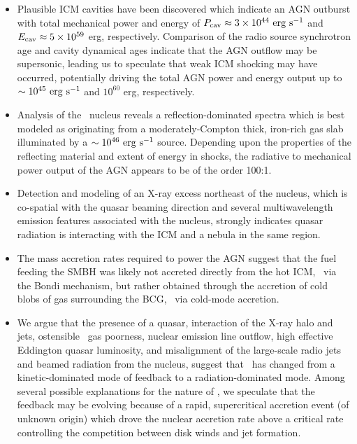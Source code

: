 \documentclass[useAMS,usenatbib]{mn2e}
\begin{document}
\begin{itemize}
\item Plausible ICM cavities have been discovered which indicate an
  AGN outburst with total mechanical power and energy of $P_{\rm{cav}}
  \approx 3 \times 10^{44} ~\rm{\mbox{\ensuremath{\rm{erg}}}~\ensuremath{\rm{\mbox{\ensuremath{\rm{s}}}^{-1}}}}$ and $E_{\rm{cav}} \approx 5 \times 10^{59}$
  erg, respectively. Comparison of the radio source synchrotron age
  and cavity dynamical ages indicate that the AGN outflow may be
  supersonic, leading us to speculate that weak ICM shocking may have
  occurred, potentially driving the total AGN power and energy output
  up to $\sim 10^{45} ~\rm{\mbox{\ensuremath{\rm{erg}}}~\ensuremath{\rm{\mbox{\ensuremath{\rm{s}}}^{-1}}}}$ and $10^{60}$ erg, respectively.
\item Analysis of the \irs\ nucleus reveals a reflection-dominated
  spectra which is best modeled as originating from a
  moderately-Compton thick, iron-rich gas slab illuminated by a $\sim
  10^{46} ~\rm{\mbox{\ensuremath{\rm{erg}}}~\ensuremath{\rm{\mbox{\ensuremath{\rm{s}}}^{-1}}}}$ source. Depending upon the properties of the
  reflecting material and extent of energy in shocks, the radiative to
  mechanical power output of the AGN appears to be of the order 100:1.
\item Detection and modeling of an X-ray excess northeast of the
  nucleus, which is co-spatial with the quasar beaming direction and
  several multiwavelength emission features associated with the
  nucleus, strongly indicates quasar radiation is interacting with the
  ICM and a nebula in the same region.
\item The mass accretion rates required to power the AGN suggest that
  the fuel feeding the SMBH was likely not accreted directly from the
  hot ICM, \ie\ via the Bondi mechanism, but rather obtained through
  the accretion of cold blobs of gas surrounding the BCG, \ie\ via
  cold-mode accretion.
\item We argue that the presence of a quasar, interaction of the X-ray
  halo and jets, ostensible \irs\ gas poorness, nuclear emission line
  outflow, high effective Eddington quasar luminosity, and
  misalignment of the large-scale radio jets and beamed radiation from
  the nucleus, suggest that \irs\ has changed from a kinetic-dominated
  mode of feedback to a radiation-dominated mode. Among several
  possible explanations for the nature of \irs, we speculate that the
  feedback may be evolving because of a rapid, supercritical accretion
  event (of unknown origin) which drove the nuclear accretion rate
  above a critical rate controlling the competition between disk winds
  and jet formation.
\end{itemize}

\end{document}
